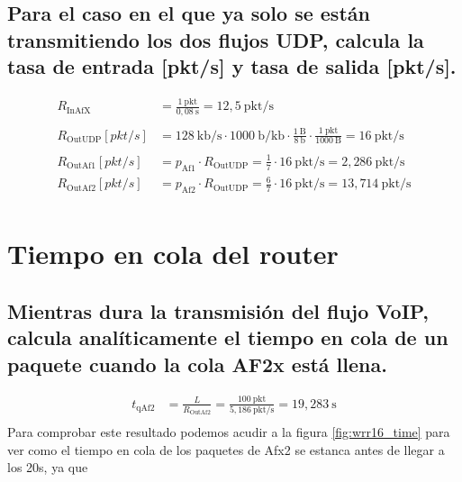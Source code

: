\vspace{0,3cm}

\subsection{Para el caso en el que ya solo se están transmitiendo los dos flujos UDP, calcula la tasa de entrada [pkt/s] y
tasa de salida [pkt/s].}
\[
    \begin{aligned}
        R_{\text{InAfX}} &= \frac{1~\text{pkt}}{0,08~\text{s}} = 12,5~\text{pkt/s} \\ \\
        R_{\text{OutUDP}}[pkt/s] &= 128~\text{kb/s} \cdot 1000~\text{b/kb} \cdot \frac{1~\text{B}}{8~\text{b}} \cdot \frac{1~\text{pkt}}{1000~\text{B}} = 16~\text{pkt/s} \\ \\
        R_{\text{OutAf1}}[pkt/s] &= p_{\text{Af1}} \cdot R_{\text{OutUDP}} = \frac{1}{7} \cdot 16~\text{pkt/s} = 2,286~\text{pkt/s} \\
        R_{\text{OutAf2}}[pkt/s] &= p_{\text{Af2}} \cdot R_{\text{OutUDP}} = \frac{6}{7} \cdot 16~\text{pkt/s} = 13,714~\text{pkt/s} \\
    \end{aligned}
\]

\vspace{1cm}

\section{Tiempo en cola del router}
\subsection{Mientras dura la transmisión del flujo VoIP, calcula analíticamente el tiempo en cola de un paquete cuando
la cola AF2x está llena.}
\[
    \begin{aligned}
        t_{\text{qAf2}} &= \frac{L}{R_{\text{OutAf2}}} = \frac{100~\text{pkt}}{5,186~\text{pkt/s}}= 19,283~\text{s} \\
    \end{aligned}
\]
Para comprobar este resultado podemos acudir a la figura \ref{fig:wrr16_time} para ver como el tiempo 
en cola de los paquetes de Afx2 se estanca antes de llegar a los 20s, ya que

